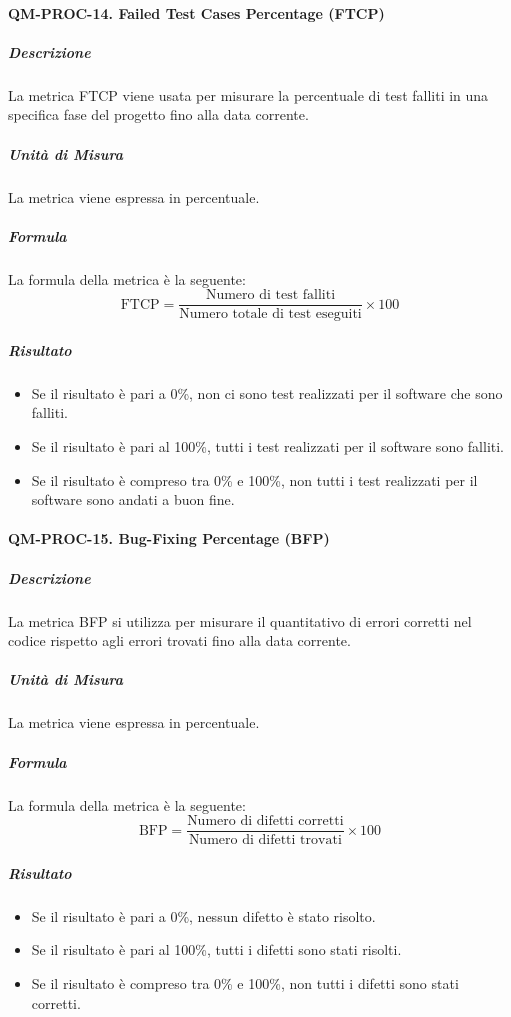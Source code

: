 		\paragraph{QM-PROC-14. Failed Test Cases Percentage (FTCP)}

			\subparagraph{Descrizione}
			La metrica FTCP viene usata per misurare la percentuale di test falliti in una specifica fase del progetto fino alla data corrente.

			\subparagraph{Unità di Misura}
			La metrica viene espressa in percentuale.

			\subparagraph{Formula}
			La formula della metrica è la seguente:
			\[
				\text{FTCP} = \frac{\text{Numero di test falliti}}{\text{Numero totale di test eseguiti}} \times 100
			\]

			\subparagraph{Risultato}
			\begin{itemize}
				\item Se il risultato è pari a 0\%, non ci sono test realizzati per il software che sono falliti.
				\item Se il risultato è pari al 100\%, tutti i test realizzati per il software sono falliti.
				\item Se il risultato è compreso tra 0\% e 100\%, non tutti i test realizzati per il software sono andati a buon fine.
			\end{itemize}

		\paragraph{QM-PROC-15. Bug-Fixing Percentage (BFP)}

			\subparagraph{Descrizione}
			La metrica BFP si utilizza per misurare il quantitativo di errori corretti nel codice rispetto agli errori trovati fino alla data corrente.

			\subparagraph{Unità di Misura}
			La metrica viene espressa in percentuale.

			\subparagraph{Formula}
			La formula della metrica è la seguente:
			\[
				\text{BFP} = \frac{\text{Numero di difetti corretti}}{\text{Numero di difetti trovati}} \times 100
			\]

			\subparagraph{Risultato}
			\begin{itemize}
				\item Se il risultato è pari a 0\%, nessun difetto è stato risolto.
				\item Se il risultato è pari al 100\%, tutti i difetti sono stati risolti.
				\item Se il risultato è compreso tra 0\% e 100\%, non tutti i difetti sono stati corretti.
			\end{itemize}

